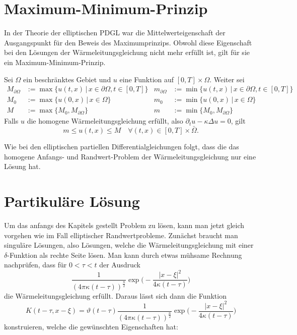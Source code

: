 \section{Maximum-Minimum-Prinzip}
In der Theorie der elliptischen PDGL war die Mittelwerteigenschaft
der Ausgangspunkt für den Beweis des Maximumprinzips. Obwohl
diese Eigenschaft bei den 
Lösungen der Wärmeleitungsgleichung nicht mehr erfüllt ist,
gilt für sie ein Maximum-Minimum-Prinzip.
\begin{satz}
Sei $\Omega$ ein beschränktes Gebiet und
$u$ eine Funktion auf $[0,T]\times\Omega$.
Weiter sei
\begin{align*}
M_{\partial \Omega}&:=\max\{u(t,x)\,|\,x\in\partial\Omega, t\in[0,T]\}
&
m_{\partial \Omega}&:=\min\{u(t,x)\,|\,x\in\partial\Omega, t\in[0,T]\}
\\
M_0&:=
\max\{u(0,x)\,|\,x\in\Omega\}
&
m_0&:=
\min\{u(0,x)\,|\,x\in\Omega\}
\\
M&:=\max\{M_0,M_{\partial\Omega}\}
&
m&:=\min\{M_0,M_{\partial\Omega}\}
\end{align*}
Falls $u$ die homogene
Wärmeleitungsgleichung erfüllt, also $\partial_tu-\kappa\Delta u=0$,
gilt
\[
m\le u(t,x)\le M\quad\forall(t,x)\in[0,T]\times\bar\Omega.
\]
\end{satz}
Wie bei den elliptischen partiellen Differentialgleichungen folgt, dass
die das homogene Anfangs- und Randwert-Problem der Wärmeleitungsgleichung
nur eine Lösung hat.

\section{Partikuläre Lösung}
Um das anfangs des Kapitels gestellt Problem zu lösen, kann man jetzt
gleich vorgehen wie im Fall elliptischer Randwertprobleme. Zunächst
braucht man singuläre Lösungen, also Lösungen, welche die
Wärmeleitungsgleichung mit einer $\delta$-Funktion als rechte Seite
lösen.
Man kann durch etwas mühsame Rechnung nachprüfen, dass für $0<\tau<t$
der Ausdruck
\[
\frac1{(4\pi\kappa(t-\tau))^{\frac{n}2}}
\exp\biggl(-\frac{|x-\xi|^2}{4\kappa(t-\tau)}\biggr)
\]
die Wärmeleitungsgleichung erfüllt. Daraus lässt sich
dann die Funktion
\begin{equation}
K(t-\tau, x-\xi)
=
\vartheta(t-\tau)
\frac1{(4\pi\kappa(t-\tau))^{\frac{n}2}}
\exp\biggl(-\frac{|x-\xi|^2}{4\kappa(t-\tau)}\biggr)
\label{parabolischsingulaer}
\end{equation}
konstruieren, welche die gewünschten Eigenschaften hat:

